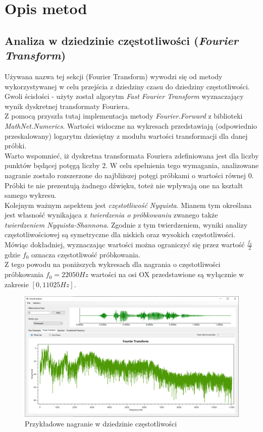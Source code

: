 \documentclass[a4paper]{article}
\begin{document}
\section{Opis metod}
\subsection{Analiza w dziedzinie częstotliwości (\textit{Fourier Transform})}
Używana nazwa tej sekcji (Fourier Transform) wywodzi się od metody wykorzystywanej w celu przejścia z dziedziny czasu do dziedziny częstotliwości.\\
Gwoli ścisłości - użyty został algorytm \textit{Fast Fourier Transform} wyznaczający wynik dyskretnej transformaty Fouriera.\\
Z pomocą przyszła tutaj implementacja metody \textit{Fourier.Forward} z biblioteki \textit{MathNet.Numerics}. Wartości widoczne na wykresach przedstawiają (odpowiednio przeskalowany) logarytm dziesiętny z modułu wartości transformacji dla danej próbki.\\
Warto wspomnieć, iż dyskretna transformata Fouriera zdefiniowana jest dla liczby punktów będącej potęgą liczby $2$. W celu spełnienia tego wymagania, analizowane nagranie zostało rozszerzone do najbliższej potęgi próbkami o wartości równej $0$. Próbki te nie prezentują żadnego dźwięku, toteż nie wpływają one na kształt samego wykresu.\\
Kolejnym ważnym aspektem jest \textit{częstotliwość Nyquista}. Mianem tym określana jest własność wynikająca z \textit{twierdzenia o próbkowaniu} zwanego także \textit{twierdzeniem Nyquista-Shannona}. Zgodnie z tym twierdzeniem, wyniki analizy częstotliwościowej są symetryczne dla niskich oraz wysokich częstotliwości. Mówiąc dokładniej, wyznaczając wartości można ograniczyć się przez wartość $\frac{f_0}{2}$ gdzie $f_0$ oznacza częstotliwość próbkowania.\\
Z tego powodu na poniższych wykresach dla nagrania o częstotliwości próbkowania $f_0 = 22 050Hz$ wartości na osi OX przedstawione są wyłącznie w zakresie $[0, 11 025Hz]$.
\begin{figure}[H]
  \includegraphics[width=\linewidth]{images/02fourier.png}
  \caption{Przykładowe nagranie w dziedzinie częstotliwości}
\end{figure}
\end{document}
